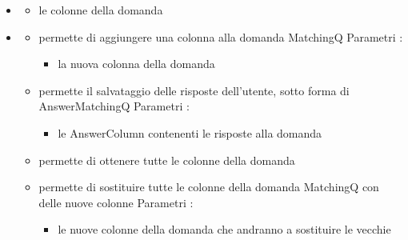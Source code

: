 \begin{itemize}
\item {}
\begin{itemize}
\item {}
\newline
le colonne della domanda
\end{itemize}
\item {}
\begin{itemize}
\item {}
\newline
permette di aggiungere una colonna alla domanda MatchingQ
\newline
Parametri :
\begin{itemize}
\item {}
\newline
la nuova colonna della domanda
\end{itemize}
\item {}
\newline
permette il salvataggio delle risposte dell'utente, sotto forma di AnswerMatchingQ
\newline
Parametri :
\begin{itemize}
\item {}
\newline
le AnswerColumn contenenti le risposte alla domanda
\end{itemize}
\item {}
\newline
permette di ottenere tutte le colonne della domanda
\newline
\item {}
\newline
permette di sostituire tutte le colonne della domanda MatchingQ con delle nuove colonne
\newline
Parametri :
\begin{itemize}
\item {}
\newline
le nuove colonne della domanda che andranno a sostituire le vecchie
\end{itemize}
\end{itemize}
\end{itemize}
